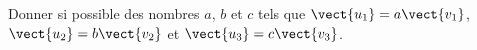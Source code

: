 
\begin{exercice}\label{exosmath-0692}

    Donner si possible des nombres \( a\), \( b\) et \( c\) tels que \( \vect{ u_1 }=a\vect{ v_1 }\), \( \vect{ u_2 }=b\vect{ v_2 }\) et \( \vect{ u_3 }=c\vect{ v_3 }\).

\begin{center}
    
\end{center}

\end{exercice}
